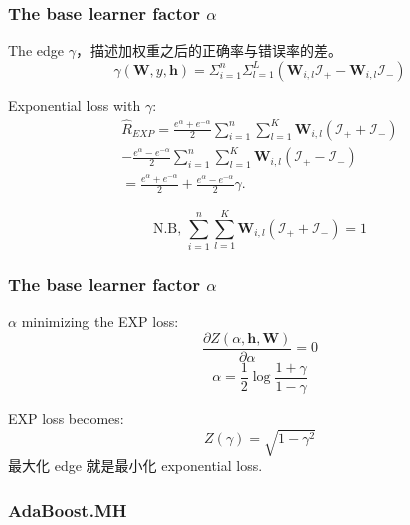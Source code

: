 \documentclass{beamer}
\begin{document}
\begin{frame}
\frametitle{The base learner factor $\alpha$}
The edge $\gamma$，描述加权重之后的正确率与错误率的差。 \\
$$ \gamma(\mathbf{W}, y, \mathbf{h}) = \Sigma_{i=1}^{n} \Sigma_{l=1}^{L} (\mathbf{W}_{i,l} \mathcal{I}_+ - \mathbf{W}_{i,l}\mathcal{I}_-)$$
\begin{block}{Exponential loss with $\gamma$:}
$$ \begin{array}{c}
\hat{R}_{EXP} = \frac{e^\alpha + e^{-\alpha}}{2}\sum_{i=1}^{n} \sum_{l=1}^{K}\mathbf{W}_{i,l}(\mathcal{I}_+ + \mathcal{I}_-) \\
 - \frac{e^\alpha - e^{-\alpha}}{2}\sum_{i=1}^{n}\sum_{l=1}^{K}\mathbf{W}_{i,l}(\mathcal{I}_+ - \mathcal{I}_-) \\
 = \frac{e^\alpha + e^{-\alpha}}{2} + \frac{e^\alpha - e^{-\alpha}}{2}\gamma.
\end{array} $$
\end{block}
$$\text{N.B,   } \sum_{i=1}^{n} \sum_{l=1}^{K}\mathbf{W}_{i,l}(\mathcal{I}_+ + \mathcal{I}_-) = 1$$
\end{frame}


\begin{frame}
\frametitle{The base learner factor $\alpha$}
\begin{block}{$\alpha$ minimizing the EXP loss:}
$$\frac{\partial Z(\alpha, \mathbf{h}, \mathbf{W})}{\partial \alpha} = 0$$
$$\alpha = \frac{1}{2} \log \frac{1+\gamma}{1-\gamma}$$
\end{block}

\pause

\begin{block}{EXP loss becomes:}
$$Z(\gamma) = \sqrt{1 - \gamma^2}$$
最大化 edge 就是最小化 exponential loss.
\end{block}

\end{frame}

\begin{frame}
\frametitle{AdaBoost.MH}
\begin{algorithm}[H]
\end{algorithm}
\end{frame}
\end{document}
